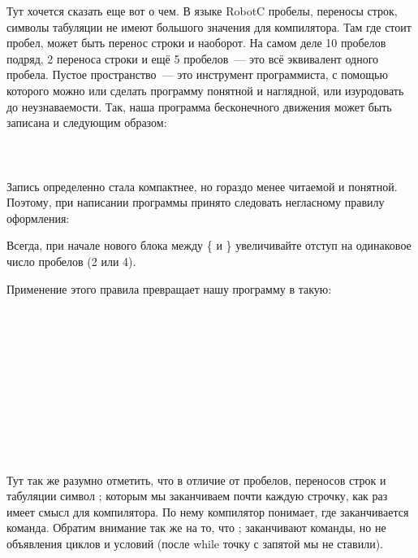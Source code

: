Тут хочется сказать еще вот о чем. В языке RobotC пробелы, переносы строк, символы табуляции не имеют большого значения для компилятора. Там где стоит пробел, может быть перенос строки и наоборот. На самом деле 10 пробелов подряд, 2 переноса строки и ещё 5 пробелов~--- это всё эквивалент одного пробела. Пустое пространство~--- это инструмент программиста, с помощью которого можно или сделать программу понятной и наглядной, или изуродовать до неузнаваемости. Так, наша программа бесконечного движения может быть записана и следующим образом:\\\\

{\programm
	{\slshape{}}\rC{\}\}}
}\\\\	

Запись определенно стала компактнее, но гораздо менее читаемой и понятной. Поэтому, при написании программы принято следовать негласному правилу оформления:

Всегда, при начале нового блока между \{ и \} увеличивайте отступ на одинаковое число пробелов (2 или 4).

Применение этого правила превращает нашу программу в такую:\\\\

{\programm
	{\slshape{}}\rC{()}\\
	\rC{\{}\\
	\\
	\indent\rC{\{}\\
	\indent\indent{}\\
	\indent\indent{}\\
	\indent\rC{\}}\\
	\rC{\}}\\
}\\\\

Тут так же разумно отметить, что в отличие от пробелов, переносов строк и табуляции символ ; которым мы заканчиваем почти каждую строчку, как раз имеет смысл для компилятора. По нему компилятор понимает, где заканчивается команда. Обратим внимание так же на то, что ; заканчивают команды, но не объявления циклов и условий (после while точку с запятой мы не ставили).

